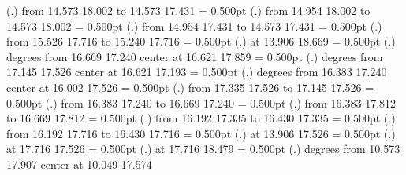 {\setplotsymbol ({\thinlinefont .})
{\color[rgb]{0,0,0}\putrule from 14.573 18.002 to 14.573 17.431
}%
%
%
\linethickness= 0.500pt
\setplotsymbol ({\thinlinefont .})
{\color[rgb]{0,0,0}\putrule from 14.954 18.002 to 14.573 18.002
}%
%
%
\linethickness= 0.500pt
\setplotsymbol ({\thinlinefont .})
{\color[rgb]{0,0,0}\putrule from 14.954 17.431 to 14.573 17.431
}%
%
%
\linethickness= 0.500pt
\setplotsymbol ({\thinlinefont .})
{\color[rgb]{0,0,0}\putrule from 15.526 17.716 to 15.240 17.716
}%
%
%
\linethickness= 0.500pt
\setplotsymbol ({\thinlinefont .})
{\color[rgb]{0,0,0} at 13.906 18.669
}%
%
%
\linethickness= 0.500pt
\setplotsymbol ({\thinlinefont .})
{\color[rgb]{0,0,0} degrees from 16.669 17.240 center at 16.621 17.859
}%
%
%
\linethickness= 0.500pt
\setplotsymbol ({\thinlinefont .})
{\color[rgb]{0,0,0} degrees from 17.145 17.526 center at 16.621 17.193
}%
%
%
\linethickness= 0.500pt
\setplotsymbol ({\thinlinefont .})
{\color[rgb]{0,0,0} degrees from 16.383 17.240 center at 16.002 17.526
}%
%
%
\linethickness= 0.500pt
\setplotsymbol ({\thinlinefont .})
{\color[rgb]{0,0,0}\putrule from 17.335 17.526 to 17.145 17.526
}%
%
%
\linethickness= 0.500pt
\setplotsymbol ({\thinlinefont .})
{\color[rgb]{0,0,0}\putrule from 16.383 17.240 to 16.669 17.240
}%
%
%
\linethickness= 0.500pt
\setplotsymbol ({\thinlinefont .})
{\color[rgb]{0,0,0}\putrule from 16.383 17.812 to 16.669 17.812
}%
%
%
\linethickness= 0.500pt
\setplotsymbol ({\thinlinefont .})
{\color[rgb]{0,0,0}\putrule from 16.192 17.335 to 16.430 17.335
}%
%
%
\linethickness= 0.500pt
\setplotsymbol ({\thinlinefont .})
{\color[rgb]{0,0,0}\putrule from 16.192 17.716 to 16.430 17.716
}%
%
%
\linethickness= 0.500pt
\setplotsymbol ({\thinlinefont .})
{\color[rgb]{0,0,0} at 13.906 17.526
}%
%
%
\linethickness= 0.500pt
\setplotsymbol ({\thinlinefont .})
{\color[rgb]{0,0,0} at 17.716 17.526
}%
%
%
\linethickness= 0.500pt
\setplotsymbol ({\thinlinefont .})
{\color[rgb]{0,0,0} at 17.716 18.479
}%
%
%
\linethickness= 0.500pt
\setplotsymbol ({\thinlinefont .})
{\color[rgb]{0,0,0} degrees from 10.573 17.907 center at 10.049 17.574
}}
